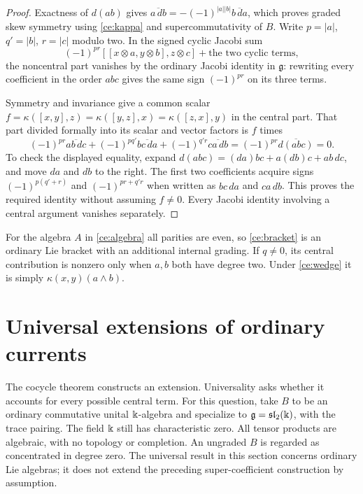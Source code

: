 \begin{proof}
Exactness of $d(ab)$ gives
$\overline{a\,db}=-(-1)^{|a||b|}\overline{b\,da}$, which proves graded
skew symmetry using \eqref{ce:kappa} and supercommutativity of $B$.
Write $p=|a|$, $q'=|b|$, $r=|c|$ modulo two.  In the signed cyclic
Jacobi sum
\[
 (-1)^{pr}[[x\otimes a,y\otimes b],z\otimes c]
       +\text{the two cyclic terms},
\]
the noncentral part vanishes by the ordinary Jacobi identity in
$\mathfrak g$: rewriting every coefficient in the order $abc$ gives
the same sign $(-1)^{pr}$ on its three terms.

Symmetry and invariance give a common scalar
$f=\kappa([x,y],z)=\kappa([y,z],x)=\kappa([z,x],y)$ in the central
part.  That part divided formally into its scalar and vector factors is
$f$ times
\begin{equation}\label{ce:jacobi}
 (-1)^{pr}\overline{ab\,dc}
 +(-1)^{pq'}\overline{bc\,da}
 +(-1)^{q'r}\overline{ca\,db}
 =(-1)^{pr}\overline{d(abc)}=0.
\end{equation}
To check the displayed equality, expand
$d(abc)=(da)bc+a(db)c+ab\,dc$, and move $da$ and $db$ to the right.
The first two coefficients acquire signs $(-1)^{p(q'+r)}$ and
$(-1)^{pr+q'r}$ when written as $bc\,da$ and $ca\,db$.
This proves the required identity without assuming $f\ne0$.
Every Jacobi identity involving a central argument vanishes separately.
\end{proof}

For the algebra $A$ in \eqref{ce:algebra} all parities are even, so
\eqref{ce:bracket} is an ordinary Lie bracket with an additional internal
grading.  If $q\ne0$, its central contribution is nonzero only when
$a,b$ both have degree two.  Under \eqref{ce:wedge} it is simply
$\kappa(x,y)(a\wedge b)$.

\section{Universal extensions of ordinary currents}
\label{ce:universal-section}

The cocycle theorem constructs an extension.  Universality asks whether
it accounts for every possible central term.  For this question, take
$B$ to be an ordinary commutative unital $\Bbbk$-algebra and specialize to
$\mathfrak g=\mathfrak{sl}_2(\Bbbk)$, with the trace pairing.  The field
$\Bbbk$ still has characteristic zero.  All tensor products are algebraic,
with no topology or completion.  An ungraded $B$ is regarded as
concentrated in degree zero.  The universal result in this section
concerns ordinary Lie algebras; it does not extend the preceding
super-coefficient construction by assumption.

